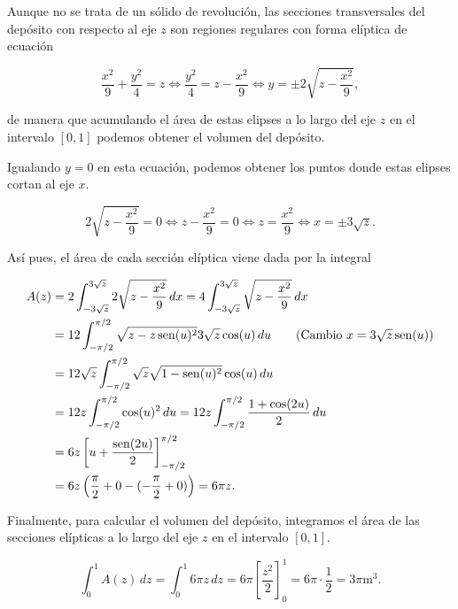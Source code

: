 \documentclass[
  a4paper,
]{scrreport}
\theoremstyle{definition}
\theoremstyle{remark}
\begin{document}
\begin{tcolorbox}[enhanced jigsaw, opacityback=0, bottomtitle=1mm, coltitle=black, opacitybacktitle=0.6, colback=white, breakable, left=2mm, titlerule=0mm, bottomrule=.15mm, colbacktitle=quarto-callout-tip-color!10!white, toprule=.15mm, leftrule=.75mm, arc=.35mm, toptitle=1mm, colframe=quarto-callout-tip-color-frame, title=\textcolor{quarto-callout-tip-color}{\faLightbulb}\hspace{0.5em}{Solución}, rightrule=.15mm]

Aunque no se trata de un sólido de revolución, las secciones
transversales del depósito con respecto al eje \(z\) son regiones
regulares con forma elíptica de ecuación

\[
\frac{x^2}{9} + \frac{y^2}{4} = z 
\Leftrightarrow \frac{y^2}{4} = z - \frac{x^2}{9}
\Leftrightarrow y = \pm 2\sqrt{z - \frac{x^2}{9}},
\]

de manera que acumulando el área de estas elipses a lo largo del eje
\(z\) en el intervalo \([0,1]\) podemos obtener el volumen del depósito.

Igualando \(y=0\) en esta ecuación, podemos obtener los puntos donde
estas elipses cortan al eje \(x\).

\[
2\sqrt{z - \frac{x^2}{9}} = 0 
\Leftrightarrow z - \frac{x^2}{9} = 0 
\Leftrightarrow z = \frac{x^2}{9}
\Leftrightarrow x = \pm 3\sqrt{z}.
\]

Así pues, el área de cada sección elíptica viene dada por la integral

\begin{align*}
A(z) 
&= 2\int_{-3\sqrt{z}}^{3\sqrt{z}} 2\sqrt{z - \frac{x^2}{9}}\,dx 
= 4\int_{-3\sqrt{z}}^{3\sqrt{z}} \sqrt{z - \frac{x^2}{9}}\,dx \\
&= 12 \int_{-\pi/2}^{\pi/2} \sqrt{z - z\operatorname{sen}(u)^2} 3\sqrt{z}\cos(u)\,du \tag{Cambio $x=3\sqrt{z}\operatorname{sen}(u)$}\\
&= 12\sqrt{z} \int_{-\pi/2}^{\pi/2} \sqrt{z}\sqrt{1 - \operatorname{sen}(u)^2}\cos(u)\,du \\
&= 12z \int_{-\pi/2}^{\pi/2} \cos(u)^2\,du
= 12z \int_{-\pi/2}^{\pi/2} \frac{1 + \cos(2u)}{2}\,du \\
&= 6z \left[ u + \frac{\operatorname{sen}(2u)}{2} \right]_{-\pi/2}^{\pi/2} \\
&= 6z \left( \frac{\pi}{2} + 0 - (-\frac{\pi}{2} + 0) \right)
= 6\pi z.
\end{align*}

Finalmente, para calcular el volumen del depósito, integramos el área de
las secciones elípticas a lo largo del eje \(z\) en el intervalo
\([0,1]\).

\[
\int_0^1 A(z)\,dz 
= \int_0^1 6\pi z\,dz 
= 6\pi \left[ \frac{z^2}{2} \right]_0^1
= 6\pi \cdot \frac{1}{2}
= 3\pi \mbox{m}^3.
\]

\end{tcolorbox}
\end{document}
